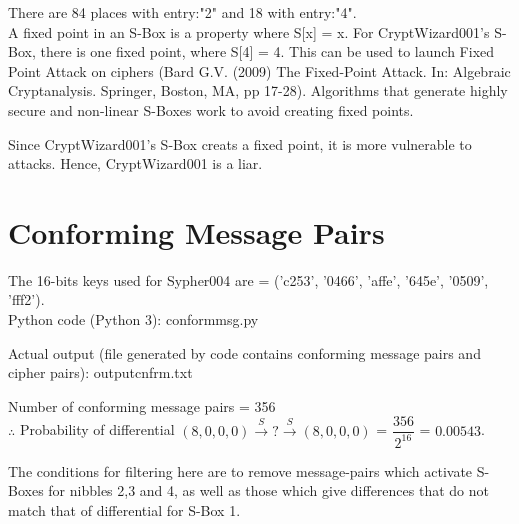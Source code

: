 \documentclass[12pt]{article}
\begin{document}
\begin{large}
\begin{center}
\end{center}

There are 84 places with entry:"2" and 18 with entry:"4".\\

A fixed point in an S-Box is a property where S[x] = x. For CryptWizard001's S-Box, there is one fixed point, where S[4] = 4. This can be used to launch Fixed Point Attack on ciphers (Bard G.V. (2009) The Fixed-Point Attack. In: Algebraic Cryptanalysis. Springer, Boston, MA, pp 17-28). Algorithms that generate highly secure and non-linear S-Boxes work to avoid creating fixed points.

Since CryptWizard001's S-Box creats a fixed point, it is more vulnerable to attacks. Hence, CryptWizard001 is a liar.

\end{large}
\vspace{0.5cm}

\section{Conforming Message Pairs}
\begin{large}

The 16-bits keys used for Sypher004 are = ('c253', '0466', 'affe', '645e', '0509', 'fff2').\\
Python code (Python 3): conform\textunderscore msg.py



Actual output (file generated by code contains conforming message pairs and cipher pairs): output\textunderscore cnfrm.txt

Number of conforming message pairs = 356\\
$\therefore$ Probability of differential $(8,0,0,0) \xrightarrow{S} ? \xrightarrow{S} (8,0,0,0)$ = $\dfrac{356}{2^{16}}$ = $0.00543$.

The conditions for filtering here are to remove message-pairs which activate S-Boxes for nibbles 2,3 and 4, as well as those which give differences that do not match that of differential for S-Box 1.

\end{large}
\end{document}
